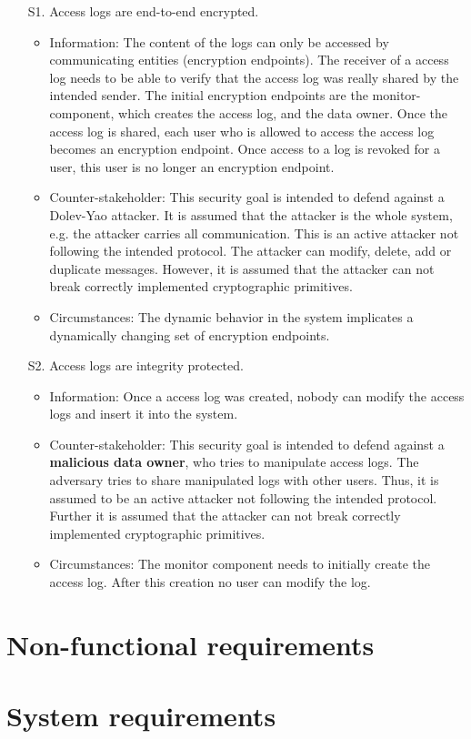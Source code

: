 \documentclass[../main.tex]{subfiles}
\begin{document}
\begin{enumerate}
    \item [S1.] Access logs are end-to-end encrypted.
    \begin{itemize}
        \item Information: 
        The content of the logs can only be accessed by communicating entities (encryption endpoints).
        The receiver of a access log needs to be able to verify that the access log was really shared by the intended sender. 
        The initial encryption endpoints are the monitor-component, which creates the access log, and the data owner.
        Once the access log is shared, each user who is allowed to access the access log becomes an encryption endpoint.
        Once access to a log is revoked for a user, this user is no longer an encryption endpoint.
        \item Counter-stakeholder:
        This security goal is intended to defend against a Dolev-Yao attacker.
        It is assumed that the attacker is the whole system, e.g. the attacker carries all communication.
        This is an active attacker not following the intended protocol.
        The attacker can modify, delete, add or duplicate messages.
        However, it is assumed that the attacker can not break correctly implemented cryptographic primitives. 
        \item Circumstances: 
        The dynamic behavior in the system implicates a dynamically changing set of encryption endpoints.
    \end{itemize}
    \item [S2.] Access logs are integrity protected.
    \begin{itemize}
        \item Information: 
        Once a access log was created, nobody can modify the access logs and insert it into the system.
        \item Counter-stakeholder: 
        This security goal is intended to defend against a \textbf{malicious data owner}, who tries to manipulate access logs. 
        The adversary tries to share manipulated logs with other users.
        Thus, it is assumed to be an active attacker not following the intended protocol.
        Further it is assumed that the attacker can not break correctly implemented cryptographic primitives.
        \item Circumstances: 
        The monitor component needs to initially create the access log. 
        After this creation no user can modify the log. 
    \end{itemize}
\end{enumerate}

\section{Non-functional requirements}\label{non-functional-requriements}


\section{System requirements}\label{system-requriements}
\end{document}
